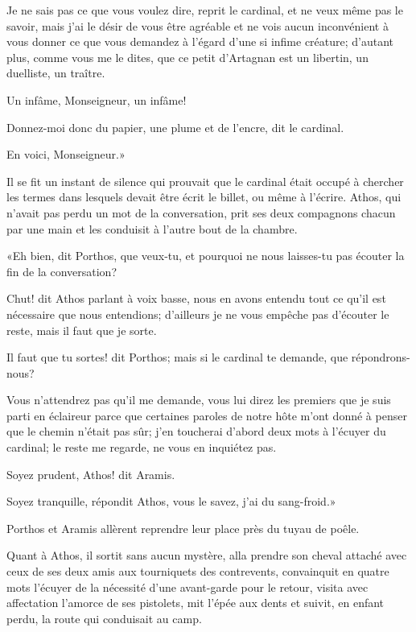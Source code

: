 \speak  Je ne sais pas ce que vous voulez dire, reprit le cardinal, et ne veux même pas le savoir, mais j'ai le désir de vous être agréable et ne vois aucun inconvénient à vous donner ce que vous demandez à l'égard d'une si infime créature; d'autant plus, comme vous me le dites, que ce petit d'Artagnan est un libertin, un duelliste, un traître. 

\speak  Un infâme, Monseigneur, un infâme! 

\speak  Donnez-moi donc du papier, une plume et de l'encre, dit le cardinal. 

\speak  En voici, Monseigneur.» 

Il se fit un instant de silence qui prouvait que le cardinal était occupé à chercher les termes dans lesquels devait être écrit le billet, ou même à l'écrire. Athos, qui n'avait pas perdu un mot de la conversation, prit ses deux compagnons chacun par une main et les conduisit à l'autre bout de la chambre. 

«Eh bien, dit Porthos, que veux-tu, et pourquoi ne nous laisses-tu pas écouter la fin de la conversation? 

\speak  Chut! dit Athos parlant à voix basse, nous en avons entendu tout ce qu'il est nécessaire que nous entendions; d'ailleurs je ne vous empêche pas d'écouter le reste, mais il faut que je sorte. 

\speak  Il faut que tu sortes! dit Porthos; mais si le cardinal te demande, que répondrons-nous? 

\speak  Vous n'attendrez pas qu'il me demande, vous lui direz les premiers que je suis parti en éclaireur parce que certaines paroles de notre hôte m'ont donné à penser que le chemin n'était pas sûr; j'en toucherai d'abord deux mots à l'écuyer du cardinal; le reste me regarde, ne vous en inquiétez pas. 

\speak  Soyez prudent, Athos! dit Aramis. 

\speak  Soyez tranquille, répondit Athos, vous le savez, j'ai du sang-froid.» 

Porthos et Aramis allèrent reprendre leur place près du tuyau de poêle. 

Quant à Athos, il sortit sans aucun mystère, alla prendre son cheval attaché avec ceux de ses deux amis aux tourniquets des contrevents, convainquit en quatre mots l'écuyer de la nécessité d'une avant-garde pour le retour, visita avec affectation l'amorce de ses pistolets, mit l'épée aux dents et suivit, en enfant perdu, la route qui conduisait au camp.